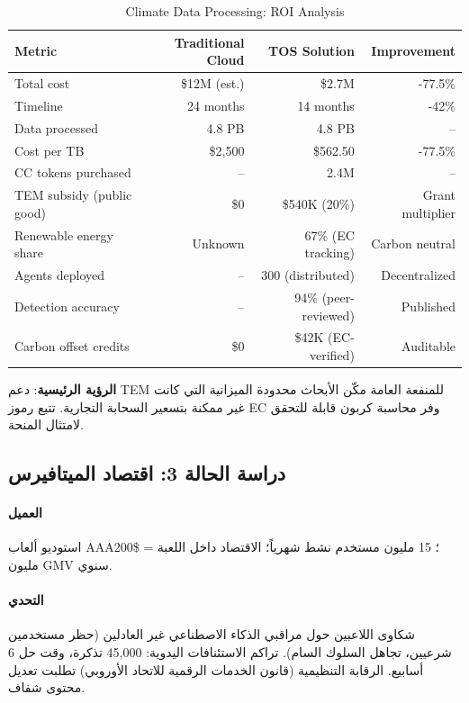 \documentclass[11pt]{article}
\begin{document}
\begin{table}[H]
\centering
\caption{Climate Data Processing: ROI Analysis}
\label{tab:climate-roi}
\begin{tabular}{@{}lrrr@{}}
\toprule
\textbf{Metric} & \textbf{Traditional Cloud} & \textbf{TOS Solution} & \textbf{Improvement} \\ \midrule
Total cost & \$12M (est.) & \$2.7M & -77.5\% \\
Timeline & 24 months & 14 months & -42\% \\
Data processed & 4.8 PB & 4.8 PB & -- \\
Cost per TB & \$2,500 & \$562.50 & -77.5\% \\
CC tokens purchased & -- & 2.4M & -- \\
TEM subsidy (public good) & \$0 & \$540K (20\%) & Grant multiplier \\
Renewable energy share & Unknown & 67\% (EC tracking) & Carbon neutral \\
Agents deployed & -- & 300 (distributed) & Decentralized \\
Detection accuracy & -- & 94\% (peer-reviewed) & Published \\
Carbon offset credits & \$0 & \$42K (EC-verified) & Auditable \\
\bottomrule
\end{tabular}
\end{table}

\textbf{الرؤية الرئيسية}: دعم TEM للمنفعة العامة مكّن الأبحاث محدودة الميزانية التي كانت غير ممكنة بتسعير السحابة التجارية. تتبع رموز EC وفر محاسبة كربون قابلة للتحقق لامتثال المنحة.

\subsection{دراسة الحالة 3: اقتصاد الميتافيرس}

\paragraph{العميل} استوديو ألعاب AAA؛ 15 مليون مستخدم نشط شهرياً؛ الاقتصاد داخل اللعبة = \$200 مليون GMV سنوي.

\paragraph{التحدي} شكاوى اللاعبين حول مراقبي الذكاء الاصطناعي غير العادلين (حظر مستخدمين شرعيين، تجاهل السلوك السام). تراكم الاستئنافات اليدوية: 45,000 تذكرة، وقت حل 6 أسابيع. الرقابة التنظيمية (قانون الخدمات الرقمية للاتحاد الأوروبي) تطلبت تعديل محتوى شفاف.
\end{document}
